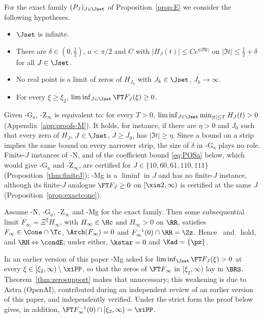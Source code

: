 For the exact family $(P_J)_{J\in\Jset}$ of Proposition~\ref{prop:E} we consider the following hypotheses.
\begin{itemize}[leftmargin=3.2em]
\item[\hyp{N}] $\Jset$ is infinite.
\item[\hyp{G$_a$}] There are $\delta\in(0,\frac12)$, $a<\pi/2$ and $C$ with $\lvert H_J(t)\rvert\le Ce^{a\lvert\Re t\rvert}$ on
$\lvert\Im t\rvert\le\frac12+\delta$ for all $J\in\Jset$.
\item[\hyp{Z$_\infty$}] No real point is a limit of zeros of $H_{J_k}$ with $J_k\in\Jset$, $J_k\to\infty$.
\item[\hyp{Mg}] For every $\xi\ge\xi_2$, $\liminf_{J\in\Jset}\FT F_J(\xi)\ge0$.
\end{itemize}
Given \hyp{G$_a$}, \hyp{Z$_\infty$} is equivalent to: for every $T>0$,
$\liminf_{J\in\Jset}\min_{\lvert t\rvert\le T}H_J(t)>0$ (Appendix~\ref{app:proofs-M}). It holds, for instance, if there are
$\eta>0$ and $J_0$ such that every zero of $H_J$, $J\in\Jset$, $J\ge J_0$, has $\lvert\Im t\rvert\ge\eta$. Since a bound on a strip implies
the same bound on every narrower strip, the size of $\delta$ in \hyp{G$_a$} plays no role. Finite-$J$ instances of \hyp{N}, and of the
coefficient bound \eqref{eq:POSa} below, which would give \hyp{G$_a$} and \hyp{Z$_\infty$}, are certified for $J\in\{10,60,61,110,111\}$
(Proposition~\ref{thm:finiteJ}); \hyp{Mg} is a $\liminf$ in $J$ and has no finite-$J$ instance, although its finite-$J$ analogue
$\FT F_J\ge0$ on $[\xin2,\infty)$ is certified at the same $J$ (Proposition~\ref{prop:exactcone}).

\begin{theorem}[Theorem D]\label{thm:criterion}
Assume \hyp{N}, \hyp{G$_a$}, \hyp{Z$_\infty$} and \hyp{Mg} for the exact family. Then some subsequential limit
$F_\infty=\Xi^2H_\infty$, with $H_\infty\in\Hc$ and $H_\infty>0$ on $\RR$, satisfies $F_\infty\in\Cone\cap\Tc$,
$\Arch(F_\infty)=0$ and $F_\infty^{-1}(0)\cap\RR=\Zz$. Hence \condS\ and \condU\ hold, and $\RH\Leftrightarrow\condE$; under either,
$\kstar=0$ and $\Kad=\{\pz\}$.
\end{theorem}

In an earlier version of this paper \hyp{Mg} asked for $\liminf_{\Jset}\FT F_J(\xi)>0$ at every $\xi\in[\xi_2,\infty)\setminus\xiPP$, so that
the zeros of $\FT F_\infty$ in $[\xi_2,\infty)$ lay in $\BRS$. Theorem~\ref{thm:zerosupport} makes that unnecessary; this weakening is due to
Astra (OpenAI), contributed during an independent review of an earlier version of this paper, and independently verified. Under the
strict form the proof below gives, in addition, $\FT F_\infty^{-1}(0)\cap[\xi_2,\infty)=\xiPP$.

